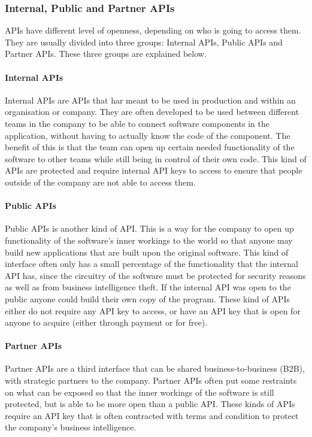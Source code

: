 \documentclass{article}
\begin{document}
\subsubsection{Internal, Public and Partner APIs}
APIs have different level of openness, depending on who is going to access them. They are
usually divided into three groups: Internal APIs, Public APIs and Partner APIs. These
three groups are explained below.
\paragraph{Internal APIs}
Internal APIs are APIs that har meant to be used in production and
within an organisation or company. They are often developed to be used
between different teams in the company to be able to connect software
components in the application, without having to actually know the code
of the component. The benefit of this is that the team can open up certain
needed functionality of the software to other teams while still being in
control of their own code. This kind of APIs are protected and require
internal API keys to access to ensure that people outside of the company
are not able to access them.
\paragraph{Public APIs}
Public APIs is another kind of API. This is a way for the company to
open up functionality of the software's inner workings to the world so
that anyone may build new applications that are built upon the original
software. This kind of interface often only has a small percentage of
the functionality that the internal API has, since the circuitry of the
software must be protected for security reasons as well as from business
intelligence theft. If the internal API was open to the public anyone
could build their own copy of the program. These kind of APIs either do
not require any API key to access, or have an API key that is open for
anyone to acquire (either through payment or for free).
\paragraph{Partner APIs}
Partner APIs are a third interface that can be shared
business-to-business (B2B), with strategic partners to the company.
Partner APIs often put some restraints on what can be exposed so that
the inner workings of the software is still protected, but is able to be
more open than a public API. These kinds of APIs require an API key that
is often contracted with terms and condition to protect the company's
business intelligence.\cite{levin}
\end{document}
